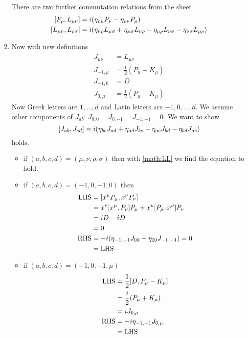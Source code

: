 \begin{enumerate}
		There are two further commutation relations from the sheet
		\begin{align}
			\comm{P_\rho}{L_{\mu\nu}} &= i (\eta_{\rho\mu}P_\nu - \eta_{\rho\nu}P_\mu) \\
			\comm{L_{\mu\nu}}{L_{\rho\sigma}} &= i (\eta_{\nu\rho}L_{\mu\sigma} + \eta_{\mu\sigma}L_{\nu\rho} - \eta_{\mu\rho}L_{\nu\sigma} - \eta_{\nu\sigma}L_{\mu\rho}) \label{math:LL}
		\end{align}

	\item Now with new definitions
		\begin{align}
			\begin{split}
				J_{\mu\nu} &= L_{\mu\nu} \\
				J_{-1,\mu} &= \frac{1}{2} (P_\mu - K_\mu) \\
				J_{-1,0} &= D \\
				J_{0,\mu} &= \frac{1}{2} (P_\mu + K_\mu)
			\end{split}
		\end{align}
		Now Greek letters are $1,\dots,d$ and Latin letters are $-1, 0,\dots,d$. We assume other components of $J_{ab}$: $J_{0,0} = J_{0, -1} = J_{-1,-1} = 0$. We want to show
		\begin{equation}
			\comm{J_{ab}}{J_{cd}} = i (\eta_{bc}J_{ad} + \eta_{ad}J_{bc} - \eta_{ac}J_{bd} - \eta_{bd}J_{ac}) \label{math:JJ}
		\end{equation}
		holds.
		\begin{itemize}
			\item if $(a,b,c,d) = (\mu,\nu,\rho,\sigma)$ then with \eqref{math:LL} we find the equation to hold.
			\item if $(a,b,c,d) = (-1, 0 , -1, 0)$
				then
				\begin{align*}
					\text{LHS} &= \comm{x^\mu P_\mu}{x^\nu P_\nu} \\
								  &= x^\nu\comm{x^\mu}{P_\nu}P_\mu + x^\mu\comm{P_\mu}{x^\nu}P_\nu \\
								  &= i D - iD \\
								  &= 0 \\
					\text{RHS} &= -i(\eta_{-1,-1}J_{00} - \eta_{00} J_{-1,-1}) = 0 \\
								  &= \text{LHS}
				\end{align*}
			\item if $(a,b,c,d) = (-1,0,-1,\mu)$
				\begin{align*}
					\text{LHS} &= \frac{1}{2} \comm{D}{P_\mu - K_\mu} \\
								  &= \frac{i}{2} (P_\mu + K_\mu)  \\
								  &= iJ_{0,\mu} \\
					\text{RHS} &= - i \eta_{-1,-1} J_{0,\mu} \\
								  &= \text{LHS}
				\end{align*}


\end{itemize}
\end{enumerate}
